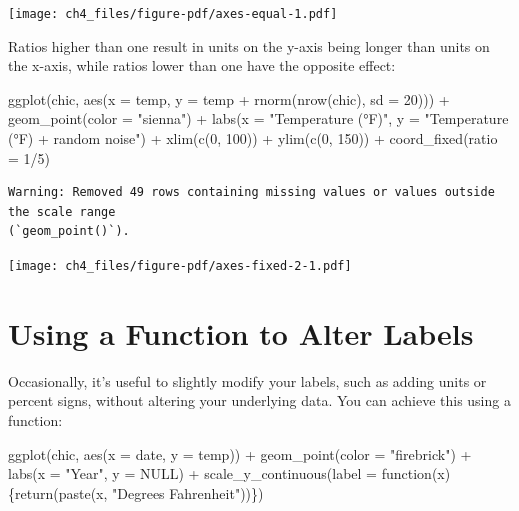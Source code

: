 \documentclass[
  letterpaper,
  DIV=11,
  numbers=noendperiod]{scrreprt}
\newenvironment{Shaded}{\begin{snugshade}}{\end{snugshade}}
\newcommand{\AttributeTok}[1]{\textcolor[rgb]{0.40,0.45,0.13}{#1}}
\newcommand{\ConstantTok}[1]{\textcolor[rgb]{0.56,0.35,0.01}{#1}}
\newcommand{\ControlFlowTok}[1]{\textcolor[rgb]{0.00,0.23,0.31}{#1}}
\newcommand{\DecValTok}[1]{\textcolor[rgb]{0.68,0.00,0.00}{#1}}
\newcommand{\FunctionTok}[1]{\textcolor[rgb]{0.28,0.35,0.67}{#1}}
\newcommand{\NormalTok}[1]{\textcolor[rgb]{0.00,0.23,0.31}{#1}}
\newcommand{\SpecialCharTok}[1]{\textcolor[rgb]{0.37,0.37,0.37}{#1}}
\newcommand{\StringTok}[1]{\textcolor[rgb]{0.13,0.47,0.30}{#1}}
\begin{document}
\texttt{[image: ch4\_files/figure-pdf/axes-equal-1.pdf]}

Ratios higher than one result in units on the y-axis being longer than
units on the x-axis, while ratios lower than one have the opposite
effect:

\begin{Shaded}
\begin{Highlighting}[]
\FunctionTok{ggplot}\NormalTok{(chic, }\FunctionTok{aes}\NormalTok{(}\AttributeTok{x =}\NormalTok{ temp, }\AttributeTok{y =}\NormalTok{ temp }\SpecialCharTok{+} \FunctionTok{rnorm}\NormalTok{(}\FunctionTok{nrow}\NormalTok{(chic), }\AttributeTok{sd =} \DecValTok{20}\NormalTok{))) }\SpecialCharTok{+}
  \FunctionTok{geom\_point}\NormalTok{(}\AttributeTok{color =} \StringTok{"sienna"}\NormalTok{) }\SpecialCharTok{+}
  \FunctionTok{labs}\NormalTok{(}\AttributeTok{x =} \StringTok{"Temperature (°F)"}\NormalTok{, }\AttributeTok{y =} \StringTok{"Temperature (°F) + random noise"}\NormalTok{) }\SpecialCharTok{+}
  \FunctionTok{xlim}\NormalTok{(}\FunctionTok{c}\NormalTok{(}\DecValTok{0}\NormalTok{, }\DecValTok{100}\NormalTok{)) }\SpecialCharTok{+} \FunctionTok{ylim}\NormalTok{(}\FunctionTok{c}\NormalTok{(}\DecValTok{0}\NormalTok{, }\DecValTok{150}\NormalTok{)) }\SpecialCharTok{+}
  \FunctionTok{coord\_fixed}\NormalTok{(}\AttributeTok{ratio =} \DecValTok{1}\SpecialCharTok{/}\DecValTok{5}\NormalTok{)}
\end{Highlighting}
\end{Shaded}

\begin{verbatim}
Warning: Removed 49 rows containing missing values or values outside the scale range
(`geom_point()`).
\end{verbatim}

\texttt{[image: ch4\_files/figure-pdf/axes-fixed-2-1.pdf]}

\section{Using a Function to Alter
Labels}\label{using-a-function-to-alter-labels}

Occasionally, it's useful to slightly modify your labels, such as adding
units or percent signs, without altering your underlying data. You can
achieve this using a function:

\begin{Shaded}
\begin{Highlighting}[]
\FunctionTok{ggplot}\NormalTok{(chic, }\FunctionTok{aes}\NormalTok{(}\AttributeTok{x =}\NormalTok{ date, }\AttributeTok{y =}\NormalTok{ temp)) }\SpecialCharTok{+}
  \FunctionTok{geom\_point}\NormalTok{(}\AttributeTok{color =} \StringTok{"firebrick"}\NormalTok{) }\SpecialCharTok{+}
  \FunctionTok{labs}\NormalTok{(}\AttributeTok{x =} \StringTok{"Year"}\NormalTok{, }\AttributeTok{y =} \ConstantTok{NULL}\NormalTok{) }\SpecialCharTok{+}
  \FunctionTok{scale\_y\_continuous}\NormalTok{(}\AttributeTok{label =} \ControlFlowTok{function}\NormalTok{(x) \{}\FunctionTok{return}\NormalTok{(}\FunctionTok{paste}\NormalTok{(x, }\StringTok{"Degrees Fahrenheit"}\NormalTok{))\})}
\end{Highlighting}
\end{Shaded}
\end{document}
